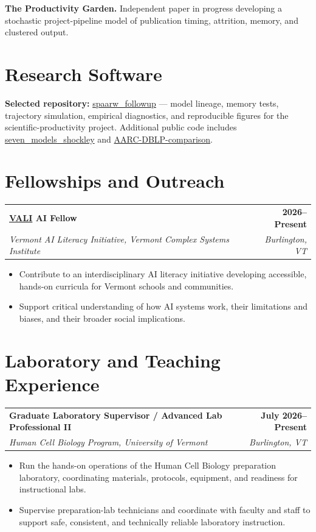 \documentclass[10pt,letterpaper]{article}
\makeatletter
\newcommand{\entry}[4]{%
  \begin{tabularx}{\textwidth}{@{}Xr@{}}
    \textbf{#1} & \textbf{#2} \\
    \textit{#3} & \textit{#4}
  \end{tabularx}\vspace{-2pt}
}
\makeatother
\begin{document}
\vspace{3pt}
\textbf{The Productivity Garden.} Independent paper in progress developing a stochastic project-pipeline model of publication timing, attrition, memory, and clustered output.

\section*{Research Software}
\textbf{Selected repository:} \href{https://github.com/crabwife/spaarw_followup}{spaarw\_followup} --- model lineage, memory tests, trajectory simulation, empirical diagnostics, and reproducible figures for the scientific-productivity project. Additional public code includes \href{https://github.com/crabwife/seven_models_shockley}{seven\_models\_shockley} and \href{https://github.com/crabwife/AARC-DBLP-comparison}{AARC-DBLP-comparison}.

\newpage

\section*{Fellowships and Outreach}
\entry{\href{https://vermontcomplexsystems.org/projects/vali/}{VALI} AI Fellow}{2026--Present}{Vermont AI Literacy Initiative, Vermont Complex Systems Institute}{Burlington, VT}
\begin{itemize}
  \item Contribute to an interdisciplinary AI literacy initiative developing accessible, hands-on curricula for Vermont schools and communities.
  \item Support critical understanding of how AI systems work, their limitations and biases, and their broader social implications.
\end{itemize}

\section*{Laboratory and Teaching Experience}
\entry{Graduate Laboratory Supervisor / Advanced Lab Professional II}{July 2026--Present}{Human Cell Biology Program, University of Vermont}{Burlington, VT}
\begin{itemize}
  \item Run the hands-on operations of the Human Cell Biology preparation laboratory, coordinating materials, protocols, equipment, and readiness for instructional labs.
  \item Supervise preparation-lab technicians and coordinate with faculty and staff to support safe, consistent, and technically reliable laboratory instruction.
\end{itemize}
\end{document}
